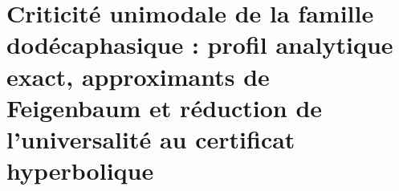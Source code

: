 \chapter{Criticité unimodale de la famille dodécaphasique : profil analytique exact, approximants de Feigenbaum et réduction de l’universalité au certificat hyperbolique}
\label{chap:p3-final:45:feigenbaum}




